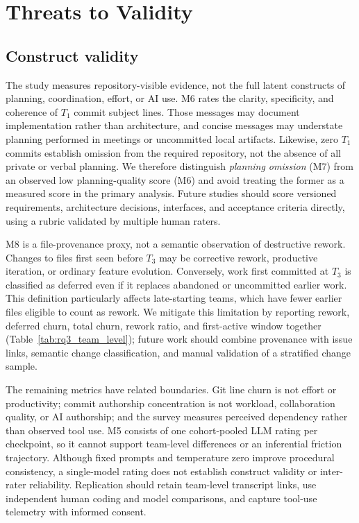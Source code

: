 \documentclass[conference]{IEEEtran}
\begin{document}
\section{Threats to Validity}

\subsection{Construct validity}

The study measures repository-visible evidence, not the full latent constructs
of planning, coordination, effort, or AI use. M6 rates the clarity,
specificity, and coherence of $T_1$ commit subject lines. Those messages may
document implementation rather than architecture, and concise messages may
understate planning performed in meetings or uncommitted local artifacts.
Likewise, zero $T_1$ commits establish omission from the required repository,
not the absence of all private or verbal planning. We therefore distinguish
\emph{planning omission} (M7) from an observed low planning-quality score (M6)
and avoid treating the former as a measured score in the primary analysis.
Future studies should score versioned requirements, architecture decisions,
interfaces, and acceptance criteria directly, using a rubric validated by
multiple human raters.

M8 is a file-provenance proxy, not a semantic observation of destructive
rework. Changes to files first seen before $T_3$ may be corrective rework,
productive iteration, or ordinary feature evolution. Conversely, work first
committed at $T_3$ is classified as deferred even if it replaces abandoned or
uncommitted earlier work. This definition particularly affects late-starting
teams, which have fewer earlier files eligible to count as rework. We mitigate
this limitation by reporting rework, deferred churn, total churn, rework ratio,
and first-active window together (Table~\ref{tab:rq3_team_level}); future work
should combine provenance with issue links, semantic change classification,
and manual validation of a stratified change sample.

The remaining metrics have related boundaries. Git line churn is not effort or
productivity; commit authorship concentration is not workload, collaboration
quality, or AI authorship; and the survey measures perceived dependency rather
than observed tool use. M5 consists of one cohort-pooled LLM rating per
checkpoint, so it cannot support team-level differences or an inferential
friction trajectory. Although fixed prompts and temperature zero improve
procedural consistency, a single-model rating does not establish construct
validity or inter-rater reliability. Replication should retain team-level
transcript links, use independent human coding and model comparisons, and
capture tool-use telemetry with informed consent.
\end{document}
